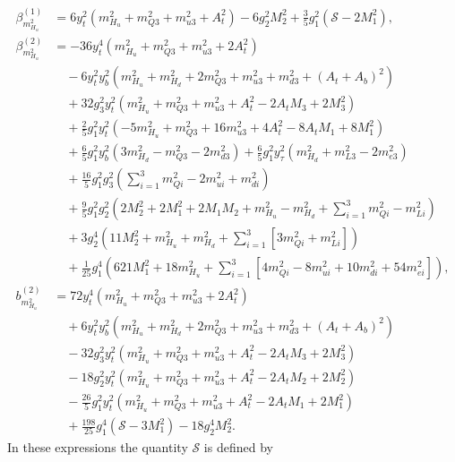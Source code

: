\documentclass[preprint,amsmath,amssymb,aps,superscriptaddress,prd,showpacs,floatfix]{revtex4-1}
\begin{document}
\begin{subequations}\label{eq:MSSMmHu2Betas}
\begin{align}
\beta_{m_{H_u}^2}^{(1)}&=6y_t^2\left ( m_{H_u}^2+m_{Q3}^2+m_{u3}^2+A_t^2\right )-6g_2^2M_2^2+\frac{3}{5}g_1^2\left ( \mathcal{S}-2M_1^2\right ),\label{eq:MSSMmHu2beta1}\\
\beta_{m_{H_u}^2}^{(2)}&=-36y_t^4(m_{H_u}^2+m_{Q3}^2+m_{u3}^2+2A_t^2)\nonumber\\
&\quad{}-6y_t^2y_b^2(m_{H_u}^2+m_{H_d}^2+2m_{Q3}^2+m_{u3}^2+m_{d3}^2+(A_t+A_b)^2)\nonumber\\
&\quad{}+32g_3^2y_t^2(m_{H_u}^2+m_{Q3}^2+m_{u3}^2+A_t^2-2A_tM_3+2M_3^2)\nonumber\\
&\quad{}+\frac{2}{5}g_1^2y_t^2(-5m_{H_u}^2+m_{Q3}^2+16m_{u3}^2+4A_t^2-8A_tM_1+8M_1^2)\nonumber\\
&\quad{}+\frac{6}{5}g_1^2y_b^2(3m_{H_d}^2-m_{Q3}^2-2m_{d3}^2)+\frac{6}{5}g_1^2y_\tau^2(m_{H_d}^2+m_{L3}^2-2m_{e3}^2)\nonumber\\
&\quad{}+\frac{16}{5}g_1^2g_3^2\left(\sum_{i=1}^3m_{Qi}^2-2m_{ui}^2+m_{di}^2\right )\nonumber\\
&\quad{}+\frac{9}{5}g_1^2g_2^2\left ( 2M_2^2+2M_1^2+2M_1M_2+m_{H_u}^2-m_{H_d}^2+\sum_{i=1}^3m_{Qi}^2-m_{Li}^2\right )\nonumber\\
&\quad{}+3g_2^4\left ( 11M_2^2+m_{H_u}^2+m_{H_d}^2+\sum_{i=1}^3[3m_{Qi}^2+m_{Li}^2]\right )\nonumber\\
&\quad{}+\frac{1}{25}g_1^4\left ( 621M_1^2+18m_{H_u}^2+\sum_{i=1}^3[4m_{Qi}^2-8m_{ui}^2+10m_{di}^2+54m_{ei}^2]\right ),\label{eq:MSSMmHu2beta2}\\
b_{m_{H_u}^2}^{(2)}&=72y_t^4\left ( m_{H_u}^2+m_{Q3}^2+m_{u3}^2+2A_t^2\right )\nonumber\\
&\quad{}+6y_t^2y_b^2\left ( m_{H_u}^2+m_{H_d}^2+2m_{Q3}^2+m_{u3}^2+m_{d3}^2+(A_t+A_b)^2\right )\nonumber\\
&\quad{}-32g_3^2y_t^2\left ( m_{H_u}^2+m_{Q3}^2+m_{u3}^2+A_t^2-2A_tM_3+2M_3^2\right )\nonumber\\
&\quad{}-18g_2^2y_t^2\left ( m_{H_u}^2+m_{Q3}^2+m_{u3}^2+A_t^2-2A_tM_2+2M_2^2\right )\nonumber\\
&\quad{}-\frac{26}{5}g_1^2y_t^2\left ( m_{H_u}^2+m_{Q3}^2+m_{u3}^2+A_t^2-2A_tM_1+2M_1^2\right )\nonumber\\
&\quad{}+\frac{198}{25}g_1^4\left ( \mathcal{S}-3M_1^2\right )-18g_2^4M_2^2.\label{eq:MSSMmHu2b2}
\end{align}
\end{subequations}
In these expressions the quantity $\mathcal{S}$ is defined by
\end{document}
